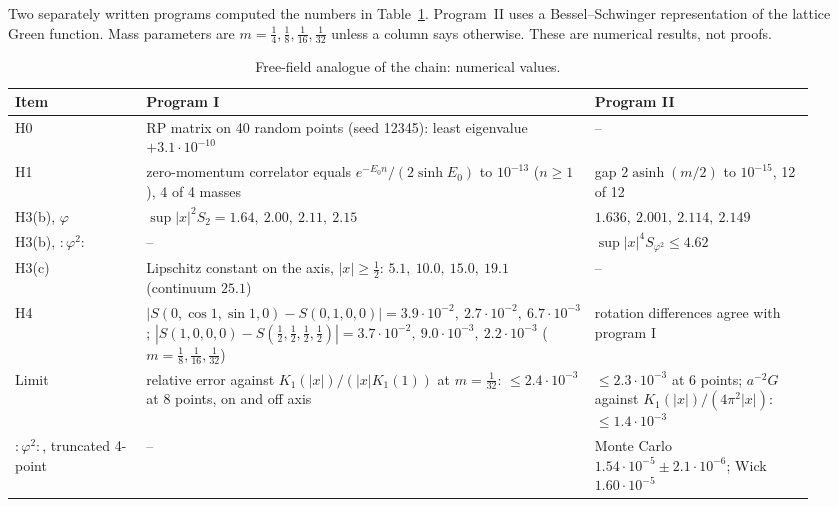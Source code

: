 Two separately written programs computed the numbers in Table~\ref{red:freetab}. Program~II uses a Bessel--Schwinger representation of the lattice Green function. Mass parameters are $m=\tfrac14,\tfrac18,\tfrac1{16},\tfrac1{32}$ unless a column says otherwise. These are numerical results, not proofs.

\begin{table}[ht]
\centering
\small
\begin{tabular}{@{}p{0.17\linewidth}p{0.47\linewidth}p{0.29\linewidth}@{}}
\toprule
Item & Program I & Program II \\
\midrule
H0 & RP matrix on 40 random points (seed 12345): least eigenvalue $+3.1\cdot10^{-10}$ & -- \\
H1 & zero-momentum correlator equals $e^{-E_0n}/(2\sinh E_0)$ to $10^{-13}$ ($n\ge1$), 4 of 4 masses & gap $2\operatorname{asinh}(m/2)$ to $10^{-15}$, 12 of 12 \\
H3(b), $\varphi$ & $\sup|x|^2S_2=1.64,\ 2.00,\ 2.11,\ 2.15$ & $1.636,\ 2.001,\ 2.114,\ 2.149$ \\
H3(b), $:\!\varphi^2\!:$ & -- & $\sup|x|^4S_{\varphi^2}\le4.62$ \\
H3(c) & Lipschitz constant on the axis, $|x|\ge\tfrac12$: $5.1,\ 10.0,\ 15.0,\ 19.1$ (continuum $25.1$) & -- \\
H4 & $|S(0,\cos1,\sin1,0)-S(0,1,0,0)|=3.9\cdot10^{-2},\ 2.7\cdot10^{-2},\ 6.7\cdot10^{-3}$; $|S(1,0,0,0)-S(\tfrac12,\tfrac12,\tfrac12,\tfrac12)|=3.7\cdot10^{-2},\ 9.0\cdot10^{-3},\ 2.2\cdot10^{-3}$ ($m=\tfrac18,\tfrac1{16},\tfrac1{32}$) & rotation differences agree with program I \\
Limit & relative error against $K_1(|x|)/(|x|K_1(1))$ at $m=\tfrac1{32}$: $\le2.4\cdot10^{-3}$ at 8 points, on and off axis & $\le2.3\cdot10^{-3}$ at 6 points; $a^{-2}G$ against $K_1(|x|)/(4\pi^2|x|)$: $\le1.4\cdot10^{-3}$ \\
$:\!\varphi^2\!:$, truncated 4-point & -- & Monte Carlo $1.54\cdot10^{-5}\pm2.1\cdot10^{-6}$; Wick $1.60\cdot10^{-5}$ \\
\bottomrule
\end{tabular}
\caption{Free-field analogue of the chain: numerical values.}\label{red:freetab}
\end{table}

